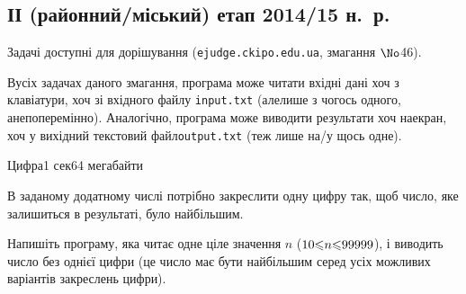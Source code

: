 \documentclass[14pt,a4paper]{extarticle}
\begin{document}

\renewenvironment{problemAllDefault}[1]{\vspace{10mm}\par\begin{problem}{#1}{\stdinOrInputTxt}{\stdoutOrOutputTxt}{1 сек}{64 мегабайти}}{\end{problem}}

\subsection{ІІ (районний/міський) етап 2014/15 н.~р.}

Задачі доступні для дорішування (\verb"ejudge.ckipo.edu.ua", змагання $\No$46).

В\nolinebreak[3] усіх задачах даного змагання, програма може читати вхідні дані хоч з клавіатури, хоч зі вхідного файлу \verb"input.txt" (але\nolinebreak[2] лише з чогось одного, а\nolinebreak[3] не\nolinebreak[2] поперемінно). Аналогічно, програма може виводити результати хоч на\nolinebreak[3] екран, хоч у вихідний текстовий файл\nolinebreak[2] \verb"output.txt" (теж лише на/у щось одне).


\vspace{-0.5\baselineskip minus 1cm}
\begin{problemAllDefault}{Цифра}

В заданому додатному числі потрібно закреслити одну цифру так, щоб число, яке залишиться в результаті, було найбільшим.

Напишіть програму, яка читає одне ціле значення $n$ ($10{\leqslant}n{\leqslant}99999$), і виводить число без однієї цифри (це число має бути найбільшим серед усіх можливих варіантів закреслень цифри).

\Examples
\begin{exampleSimple}{3em}{3em}%
%
%
\end{exampleSimple}

\end{problemAllDefault}
	

\end{document}
